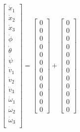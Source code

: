 \documentclass{article}
\begin{document}
\begin{equation}
    \begin{aligned}
        \begin{bmatrix}
            \dot{x}_1 \\ \dot{x}_2 \\ \dot{x}_3 \\
            \dot{\phi} \\ \dot{\theta} \\ \dot{\psi} \\
            \dot{v}_1 \\ \dot{v}_2 \\ \dot{v}_3 \\
            \dot{\omega}_1 \\ \dot{\omega}_2 \\ \dot{\omega}_3 \\
        \end{bmatrix}
        = 
        \begin{bmatrix}
            0 \\ 0 \\ 0 \\ 0 \\ 0 \\ 0 \\ 0 \\ 0 \\ 0 \\ 0 \\ 0 \\ 0
        \end{bmatrix}
        +
        \begin{bmatrix}
            0 \\ 0 \\ 0 \\ 0 \\ 0 \\ 0 \\
            0 \\
            0 \\
            0\\
            0 \\ 0 \\ 0
        \end{bmatrix}
    \end{aligned}
\end{equation}
\end{document}
